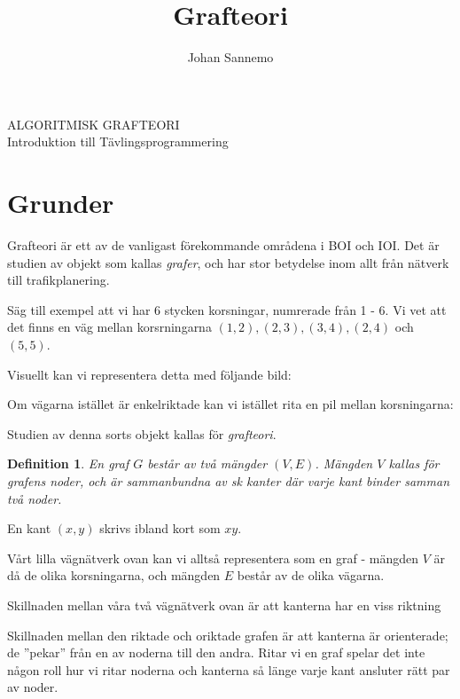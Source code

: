 \documentclass[10pt,a4paper]{article}
\author{Johan Sannemo}
\title{Grafteori}
\newtheorem{defn}{Definition}
\theoremstyle{problem}
\begin{document}
\Large{ALGORITMISK GRAFTEORI}
\\
\small{Introduktion till Tävlingsprogrammering}

\section{Grunder}

Grafteori är ett av de vanligast förekommande områdena i BOI och IOI. Det är studien av objekt som kallas \emph{grafer}, och har stor betydelse
inom allt från nätverk till trafikplanering.

Säg till exempel att vi har 6 stycken korsningar, numrerade från 1 - 6. Vi vet att det finns en väg mellan korsrningarna $(1,2), (2,3), (3, 4), (2, 4)$ och $(5, 5)$.

Visuellt kan vi representera detta med följande bild:

\begin{figure}[htp]
    \label{fig:exempelGrafer}
\end{figure}

Om vägarna istället är enkelriktade kan vi istället rita en pil mellan korsningarna:

\begin{figure}[htp]
    \label{fig:exempelGrafer}
\end{figure}

Studien av denna sorts objekt kallas för \emph{grafteori}.

\begin{defn}
    En \emph{graf} $G$ består av två mängder $(V, E)$. Mängden $V$ kallas för grafens \emph{noder}, och är sammanbundna av sk \emph{kanter} där varje kant binder samman två noder.
\end{defn}

En kant $(x, y)$ skrivs ibland kort som $xy$.

Vårt lilla vägnätverk ovan kan vi alltså representera som en graf - mängden $V$ är då de olika korsningarna, och mängden $E$ består av de olika vägarna.

Skillnaden mellan våra två vägnätverk ovan är att kanterna har en viss riktning

Skillnaden mellan den riktade och oriktade grafen är att kanterna är orienterade; de ''pekar'' från en av noderna till den andra.
Ritar vi en graf spelar det inte någon roll hur vi ritar noderna och kanterna så länge varje kant ansluter rätt par av noder.
\end{document}
